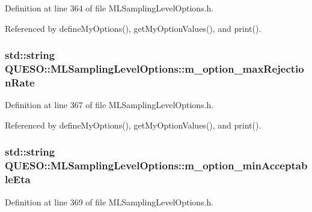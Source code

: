 Definition at line 364 of file M\-L\-Sampling\-Level\-Options.\-h.



Referenced by define\-My\-Options(), get\-My\-Option\-Values(), and print().

\hypertarget{class_q_u_e_s_o_1_1_m_l_sampling_level_options_ae226db9c741e8d6652f30c81cde61899}{
\subsubsection[{m\-\_\-option\-\_\-max\-Rejection\-Rate}]{\setlength{\rightskip}{0pt plus 5cm}std\-::string Q\-U\-E\-S\-O\-::\-M\-L\-Sampling\-Level\-Options\-::m\-\_\-option\-\_\-max\-Rejection\-Rate\hspace{0.3cm}{\ttfamily [private]}}}\label{class_q_u_e_s_o_1_1_m_l_sampling_level_options_ae226db9c741e8d6652f30c81cde61899}


Definition at line 367 of file M\-L\-Sampling\-Level\-Options.\-h.



Referenced by define\-My\-Options(), get\-My\-Option\-Values(), and print().

\hypertarget{class_q_u_e_s_o_1_1_m_l_sampling_level_options_a3af49d715cf211ed67e5206bc0d1840d}{
\subsubsection[{m\-\_\-option\-\_\-min\-Acceptable\-Eta}]{\setlength{\rightskip}{0pt plus 5cm}std\-::string Q\-U\-E\-S\-O\-::\-M\-L\-Sampling\-Level\-Options\-::m\-\_\-option\-\_\-min\-Acceptable\-Eta\hspace{0.3cm}{\ttfamily [private]}}}\label{class_q_u_e_s_o_1_1_m_l_sampling_level_options_a3af49d715cf211ed67e5206bc0d1840d}


Definition at line 369 of file M\-L\-Sampling\-Level\-Options.\-h.



